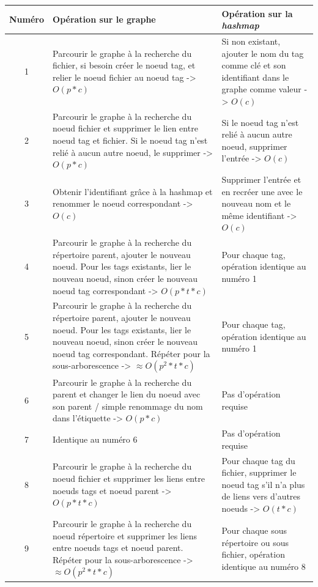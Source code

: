 \begin{center}
    \begin{tabularx}{16cm}{|c|X|p{5.5cm}|} \hline
        \textbf{Numéro} & \textbf{Opération sur le graphe} & \textbf{Opération sur la \textit{hashmap}} \\ \hline
        1 & Parcourir le graphe à la recherche du fichier, 
            si besoin créer le noeud tag, et relier le noeud fichier au noeud tag -> $O(p * c)$ 
            & Si non existant, ajouter le nom du tag comme clé et son identifiant dans le graphe 
            comme valeur -> $O(c)$ \\ \hline
        2 & Parcourir le graphe à la recherche du 
            noeud fichier et supprimer le lien entre noeud tag et fichier. Si le noeud tag 
            n'est relié à aucun autre noeud, le supprimer -> $O(p * c)$ & Si le noeud tag 
            n'est relié à aucun autre noeud, supprimer l'entrée -> $O(c)$ \\ \hline
        3 & Obtenir l'identifiant grâce à la hashmap et renommer le noeud correspondant -> $O(c)$ & 
            Supprimer l'entrée et en recréer une avec le nouveau nom et le même identifiant -> $O(c)$ \\ \hline
        4 & Parcourir le graphe à la recherche du répertoire parent, 
            ajouter le nouveau noeud. Pour les tags existants, lier le nouveau noeud, sinon créer 
            le nouveau noeud tag correspondant -> $O(p * t * c)$ & Pour chaque tag, opération identique 
            au numéro 1 \\ \hline
        5 & Parcourir le graphe à la recherche du répertoire parent, 
            ajouter le nouveau noeud. Pour les tags existants, lier le nouveau noeud, sinon créer 
            le nouveau noeud tag correspondant. Répéter pour la sous-arborescence -> $\approx 
            O(p^2 * t * c)$ & Pour chaque tag, opération identique au numéro 1 \\ \hline
        6 & Parcourir le graphe à la recherche du parent et 
            changer le lien du noeud avec son parent / simple renommage du nom dans 
            l'étiquette -> $O(p * c)$ & Pas d'opération requise \\ \hline
        7 & Identique au numéro 6 & Pas d'opération requise \\ \hline
        8 & Parcourir le graphe à la recherche du noeud fichier et supprimer les 
            liens entre noeuds tags et noeud parent -> $O(p * t * c)$ & Pour chaque tag du fichier, 
            supprimer le noeud tag s'il n'a plus de liens vers d'autres noeuds -> $O(t * c)$ \\ \hline
        9 & Parcourir le graphe à la recherche du noeud répertoire et supprimer les 
            liens entre noeuds tags et noeud parent. Répéter pour la sous-arborescence -> $\approx 
            O(p^2 * t * c)$ & Pour chaque sous répertoire ou sous fichier, opération identique au numéro 8 \\ \hline
    \end{tabularx}
    \label{table_architecture_2}
\end{center}

